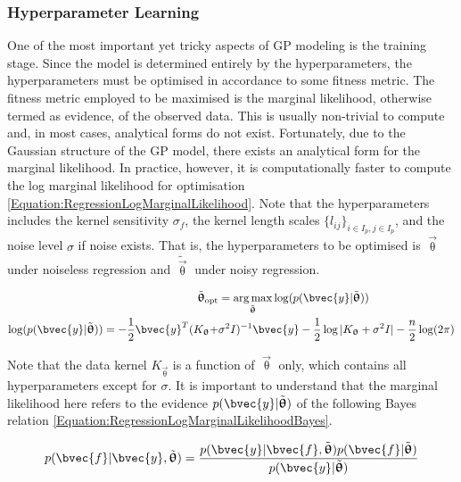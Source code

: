			\subsubsection{Hyperparameter Learning}
			\label{Background:GaussianProcesses:Regression:HyperparameterLearning}
			
				One of the most important yet tricky aspects of GP modeling is the training stage. Since the model is determined entirely by the hyperparameters, the hyperparameters must be optimised in accordance to some fitness metric. The fitness metric employed to be maximised is the marginal likelihood, otherwise termed as evidence, of the observed data. This is usually non-trivial to compute and, in most cases, analytical forms do not exist. Fortunately, due to the Gaussian structure of the GP model, there exists an analytical form for the marginal likelihood. In practice, however, it is computationally faster to compute the log marginal likelihood for optimisation \eqref{Equation:RegressionLogMarginalLikelihood}. Note that the hyperparameters includes the kernel sensitivity $\sigma_{f}$, the kernel length scales $\{l_{ij}\}_{i \in I_{p}, j \in I_{p}}$, and the noise level $\sigma$ if noise exists. That is, the hyperparameters to be optimised is $\vec{\uptheta}$ under noiseless regression and $\tilde{\vec{\uptheta}}$ under noisy regression.
							
				\begin{equation}
					\begin{aligned}
						\tilde{\vec{\uptheta}}_{\mathrm{opt}} &= \argmax_{\tilde{\vec{\uptheta}}} \log(p(\bvec{y} | \tilde{\vec{\uptheta}})) \\
						\log(p(\bvec{y} | \tilde{\vec{\uptheta}})) = - \frac{1}{2} \bvec{y}^{T} (K_{\vec{\uptheta}} + &\sigma^{2} I)^{-1} \bvec{y} - \frac{1}{2} \log|K_{\vec{\uptheta}} + \sigma^{2} I| - \frac{n}{2} \log(2 \pi)
					\end{aligned}
				\label{Equation:RegressionLogMarginalLikelihood}
				\end{equation}
				
				Note that the data kernel $K_{\vec{\uptheta}}$ is a function of $\vec{\uptheta}$ only, which contains all hyperparameters except for $\sigma$. It is important to understand that the marginal likelihood here refers to the evidence $p(\bvec{y} | \tilde{\vec{\uptheta}})$ of the following Bayes relation \eqref{Equation:RegressionLogMarginalLikelihoodBayes}.
				
				\begin{equation}
					p(\bvec{f} | \bvec{y}, \tilde{\vec{\uptheta}}) = \frac{p(\bvec{y} | \bvec{f}, \tilde{\vec{\uptheta}}) p(\bvec{f} | \tilde{\vec{\uptheta}})}{p(\bvec{y} | \tilde{\vec{\uptheta}})}
				\label{Equation:RegressionLogMarginalLikelihoodBayes}
				\end{equation}
				
